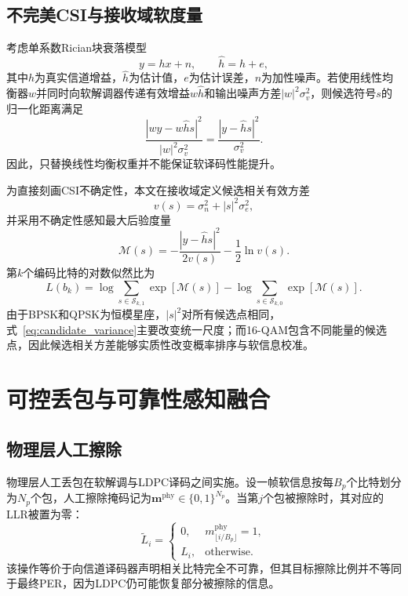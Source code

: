 \documentclass[conference]{IEEEtran}
\begin{document}
\subsection{不完美CSI与接收域软度量}
考虑单系数Rician块衰落模型
\begin{equation}
    y=h x+n,
    \qquad
    \hat h=h+e,
    \label{eq:channel}
\end{equation}
其中$h$为真实信道增益，$\hat h$为估计值，$e$为估计误差，$n$为加性噪声。若使用线性均衡器$w$并同时向软解调器传递有效增益$w\hat h$和输出噪声方差$|w|^2\sigma_v^2$，则候选符号$s$的归一化距离满足
\begin{equation}
    \frac{|wy-w\hat h s|^2}{|w|^2\sigma_v^2}
    =
    \frac{|y-\hat h s|^2}{\sigma_v^2}.
    \label{eq:cancellation}
\end{equation}
因此，只替换线性均衡权重并不能保证软译码性能提升。

为直接刻画CSI不确定性，本文在接收域定义候选相关有效方差
\begin{equation}
    v(s)=\sigma_n^2+|s|^2\sigma_e^2,
    \label{eq:candidate_variance}
\end{equation}
并采用不确定性感知最大后验度量
\begin{equation}
    \mathcal M(s)
    =-
    \frac{|y-\hat h s|^2}{2v(s)}
    -\frac{1}{2}\ln v(s).
    \label{eq:map_metric}
\end{equation}
第$k$个编码比特的对数似然比为
\begin{equation}
    L(b_k)=
    \log\sum_{s\in\mathcal S_{k,1}}\exp[\mathcal M(s)]
    -
    \log\sum_{s\in\mathcal S_{k,0}}\exp[\mathcal M(s)].
    \label{eq:llr}
\end{equation}
由于BPSK和QPSK为恒模星座，$|s|^2$对所有候选点相同，式~\eqref{eq:candidate_variance}主要改变统一尺度；而16-QAM包含不同能量的候选点，因此候选相关方差能够实质性改变概率排序与软信息校准。

\section{可控丢包与可靠性感知融合}
\subsection{物理层人工擦除}
物理层人工丢包在软解调与LDPC译码之间实施。设一帧软信息按每$B_p$个比特划分为$N_p$个包，人工擦除掩码记为$\bm m^{\mathrm{phy}}\in\{0,1\}^{N_p}$。当第$j$个包被擦除时，其对应的LLR被置为零：
\begin{equation}
    \tilde L_i=
    \begin{cases}
        0, & m^{\mathrm{phy}}_{\lfloor i/B_p\rfloor}=1,\\
        L_i, & \text{otherwise}.
    \end{cases}
    \label{eq:physical_erasure}
\end{equation}
该操作等价于向信道译码器声明相关比特完全不可靠，但其目标擦除比例并不等同于最终PER，因为LDPC仍可能恢复部分被擦除的信息。
\end{document}
